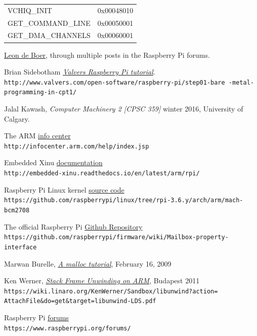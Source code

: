\documentclass[12pt, svgnames]{book}
\begin{document}
\begin{centering}
{\begin{longtable}{|l | r |}
		 VCHIQ\_INIT &                 0x00048010\\
		 
		 GET\_COMMAND\_LINE &           0x00050001\\
		 GET\_DMA\_CHANNELS &           0x00060001\\
		 \hline
	\end{longtable}
}
\end{centering}

\begin{thebibliography}{9}
	
	\href{https://www.raspberrypi.org/forums/memberlist.php?mode=viewprofile&u=213434}{Leon de Boer}, through multiple posts in the Raspberry Pi forums. 
	
	
		Brian Sidebotham 
	\textit{\href{http://www.valvers.com/open-software/raspberry-pi/step01-bare-metal-programming-in-cpt1/}{Valvers Raspberry Pi tutorial}}.
	\\\texttt{http://www.valvers.com/open-software/raspberry-pi/step01-bare
		-metal-programming-in-cpt1/}
	
	Jalal Kawash,
	\textit{Computer Machinery 2 [CPSC 359]} winter 2016, University of Calgary.
	
	The ARM \href{http://infocenter.arm.com/help/index.jsp}{info center}
	\\\texttt{http://infocenter.arm.com/help/index.jsp}
	
	Embedded Xinu \href{http://embedded-xinu.readthedocs.io/en/latest/arm/rpi/}{documentation}
	\\\texttt{http://embedded-xinu.readthedocs.io/en/latest/arm/rpi/}
	
	Raspberry Pi Linux kernel \href{https://github.com/raspberrypi/linux/tree/rpi-3.6.y/arch/arm/mach-bcm2708}{source code}
	\\\texttt{https://github.com/raspberrypi/linux/tree/rpi-3.6.y/arch/arm/mach-bcm2708}
	
	The official Raspberry Pi \href{https://github.com/raspberrypi/firmware/wiki/Mailbox-property-interface}{Github Repository}
	\\\texttt{https://github.com/raspberrypi/firmware/wiki/Mailbox-property-interface}
	
	Marwan Burelle, \textit{\href{http://www.inf.udec.cl/~leo/Malloc_tutorial.pdf}{A malloc tutorial}}, February 16, 2009
	
	Ken Werner, \textit{\href{https://wiki.linaro.org/KenWerner/Sandbox/libunwind?action=AttachFile&do=get&target=libunwind-LDS.pdf}{Stack Frame Unwinding on ARM}}, Budapest 2011 \\\texttt{https://wiki.linaro.org/KenWerner/Sandbox/libunwind?action=
		AttachFile\&do=get\&target=libunwind-LDS.pdf}
	
	Raspberry Pi \href{https://www.raspberrypi.org/forums/}{forums}
	\\\texttt{https://www.raspberrypi.org/forums/}
\end{thebibliography}
\end{document}
